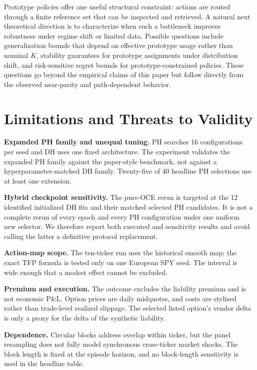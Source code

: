 \documentclass[conference]{IEEEtran}
\begin{document}
Prototype policies offer one useful structural constraint: actions are routed
through a finite reference set that can be inspected and retrieved. A natural
next theoretical direction is to characterize when such a bottleneck improves
robustness under regime shift or limited data. Possible questions include
generalization bounds that depend on effective prototype usage rather than
nominal $K$, stability guarantees for prototype assignments under distribution
shift, and risk-sensitive regret bounds for prototype-constrained policies.
These questions go beyond the empirical claims of this paper but follow
directly from the observed near-parity and path-dependent behavior.

\section{Limitations and Threats to Validity}
\label{sec:limitations}

\textbf{Expanded PH family and unequal tuning.} PH searches 16 configurations
per seed and DH uses one fixed architecture. The experiment validates the
expanded PH family against the paper-style benchmark, not against a
hyperparameter-matched DH family. Twenty-five of 40 headline PH selections use
at least one extension.

\textbf{Hybrid checkpoint sensitivity.} The pure-OCE rerun is targeted at the
12 identified initialized DH fits and their matched selected PH candidates.
It is not a complete rerun of every epoch and every PH configuration under one
uniform new selector. We therefore report both executed and sensitivity
results and avoid calling the latter a definitive protocol replacement.

\textbf{Action-map scope.} The ten-ticker run uses the historical smooth map;
the exact TFP formula is tested only on one European SPY seed. The interval is
wide enough that a modest effect cannot be excluded.

\textbf{Premium and execution.} The outcome excludes the liability premium and
is not economic P\&L. Option prices are daily midquotes, and costs are stylized
rather than trade-level realized slippage. The selected listed option's vendor
delta is only a proxy for the delta of the synthetic liability.

\textbf{Dependence.} Circular blocks address overlap within ticker, but the
panel resampling does not fully model synchronous cross-ticker market shocks.
The block length is fixed at the episode horizon, and no block-length
sensitivity is used in the headline table.
\end{document}
